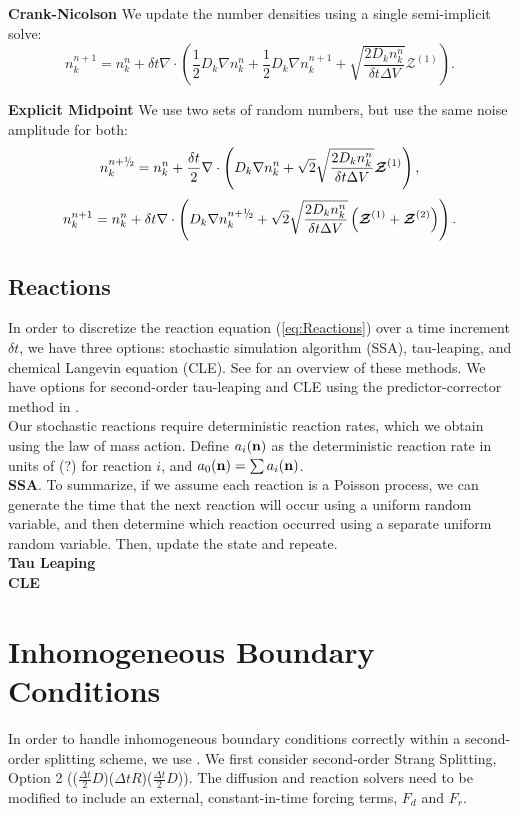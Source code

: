 \documentclass[final]{siamltex}
\def\nb  {{\bf n}}
\def\mZb {\bm{\mathcal{Z}}}
\def\half   {\frac{1}{2}}
\def\myhalf {\sfrac{1}{2}}
\newcommand{\sfrac}[2]{\mathchoice
  {\kern0em\raise.5ex\hbox{\the\scriptfont0 #1}\kern-.15em/
   \kern-.15em\lower.25ex\hbox{\the\scriptfont0 #2}}
  {\kern0em\raise.5ex\hbox{\the\scriptfont0 #1}\kern-.15em/
   \kern-.15em\lower.25ex\hbox{\the\scriptfont0 #2}}
  {\kern0em\raise.5ex\hbox{\the\scriptscriptfont0 #1}\kern-.2em/
   \kern-.15em\lower.25ex\hbox{\the\scriptscriptfont0 #2}}
  {#1\!/#2}}
\begin{document}
{\bf Crank-Nicolson}
We update the number densities using a single semi-implicit solve:
\begin{equation}
n_k^{n+1} = n_k^n + \delta t\nabla\cdot\left(
\half D_k\nabla n_k^n + \half D_k\nabla n_k^{n+1}
+ \sqrt{\frac{2 D_k n_k^n}{\delta t\Delta V}}\mZb^{(1)}
\right).
\end{equation}

{\bf Explicit Midpoint}
We use two sets of random numbers, but use the same noise amplitude for both:
\begin{equation}
n_k^{n+\myhalf} = n_k^n + \frac{\delta t}{2} \nabla\cdot\left(D_k\nabla n_k^n
+ \sqrt{2}\sqrt{\frac{2 D_k n_k^n}{\delta t\Delta V}}\mZb^{(1)}\right),
\end{equation}
\begin{equation}
n_k^{n+1} = n_k^n + \delta t\nabla\cdot\left(
D_k\nabla n_k^{n+\myhalf}
+ \sqrt{2}\sqrt{\frac{2 D_k n_k^n}{\delta t\Delta V}}\left(\mZb^{(1)}+\mZb^{(2)}\right)
\right).
\end{equation}

\subsection{Reactions}
In order to discretize the reaction equation (\ref{eq:Reactions}) over a time
increment $\delta t$, we have three options: stochastic
simulation algorithm (SSA), tau-leaping, and chemical Langevin equation (CLE).
See \cite{Gillespie2007} for an overview of these methods.  We have options
for second-order tau-leaping and CLE using the predictor-corrector
method in \cite{AndersonMattingly2011}.\\

Our stochastic reactions require deterministic reaction rates, which we obtain
using the law of mass action.  Define $a_i(\nb)$ as the deterministic reaction
rate in units of (?) for reaction $i$, and $a_0(\nb) = \sum a_i(\nb)$.\\

{\bf SSA}.  To summarize, if we assume each reaction is a Poisson process, we
can generate the time that the next reaction will occur using a uniform random
variable, and then determine which reaction occurred using a separate 
uniform random variable.  Then, update the state and repeate.\\

{\bf Tau Leaping}\\

{\bf CLE}

\section{Inhomogeneous Boundary Conditions}
In order to handle inhomogeneous boundary conditions correctly within a second-order
splitting scheme, we use \cite{Einkemmer:2014}.  We first consider second-order
Strang Splitting, Option 2 (($\frac{\Delta t}{2}D$)($\Delta t R$)($\frac{\Delta t}{2}D$)).
The diffusion and reaction solvers need to be modified to include an external, 
constant-in-time forcing terms, $F_d$ and $F_r$.
\end{document}
